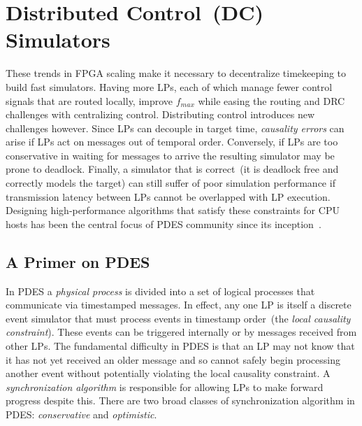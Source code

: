 \section{Distributed Control~(DC) Simulators}
These trends in FPGA scaling make it necessary to decentralize timekeeping to
build fast simulators.  Having more LPs, each of which manage fewer control
signals that are routed locally, improve ${f_{max}}$ while easing the routing and
DRC challenges with centralizing control. Distributing control introduces new
challenges however.  Since LPs can decouple in target time, \emph{causality errors} can
arise if LPs act on messages out of temporal order. Conversely, if LPs are too
conservative in waiting for messages to arrive the resulting simulator may be prone to deadlock.
Finally, a simulator that is correct~(it is deadlock free and correctly models the target) can still suffer of poor simulation performance if transmission
latency between LPs cannot be overlapped with LP execution. Designing
high-performance algorithms that satisfy these constraints for CPU hosts has been the central focus of PDES
community since its inception~\cite{PDESFujimotoPrimer}.

\subsection{A Primer on PDES}

In PDES a \emph{physical process} is divided into a set of logical processes
that communicate via timestamped messages. In effect, any one LP is itself a discrete
event simulator that must process events in timestamp order~(the
\emph{local causality constraint}). These events can be triggered internally or
by messages received from other LPs. The fundamental difficulty in PDES is that
an LP may not know that it has not yet received an older message and so cannot
safely begin processing another event without potentially violating the local
causality constraint. A \emph{synchronization algorithm} is responsible for
allowing LPs to make forward progress despite this. There are two broad classes of synchronization algorithm in PDES:
\emph{conservative} and \emph{optimistic}.

